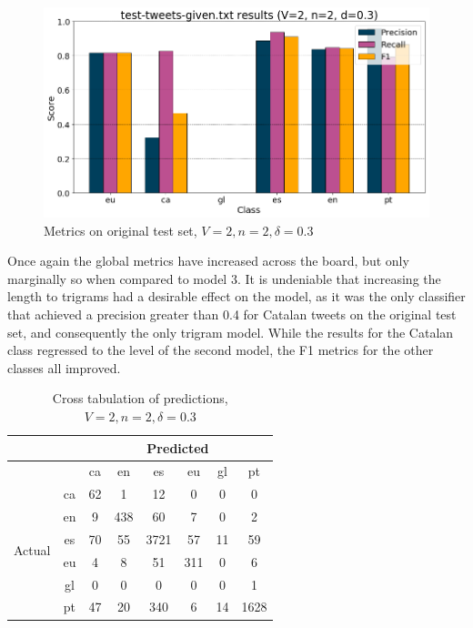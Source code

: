 \documentclass[runningheads]{llncs}
\begin{document}
\begin{figure}
    \begin{center}
        \includegraphics[width=12.5cm]{images/test_tweets_given_results_2_2_0-3.png}
        \caption{Metrics on original test set, $V=2, n=2, \delta=0.3$}
        \label{fig:pre_demo_2_2_0.3}
    \end{center}
\end{figure}

Once again the global metrics have increased across the board, but only marginally so when compared to model 3. It is undeniable that increasing the length to trigrams had a desirable effect on the model, as it was the only classifier that achieved a precision greater than 0.4 for Catalan tweets on the original test set, and consequently the only trigram model. While the results for the Catalan class regressed to the level of the second model, the F1 metrics for the other classes all improved.

\begin{table}
	\centering
	\caption{Cross tabulation of predictions, $V=2, n=2, \delta=0.3$}
	\label{tab:pre_demo_confusion_2_2_0.3}
	\begin{tabular}{|c|c|c|c|c|c|c|c|} \hline
		& & \multicolumn{6}{c|}{Predicted} \\ \hline
		& &  ca &   en &    es &   eu &  gl &    pt \\ \hline
		\multirow{6}{*}{Actual} & ca   &  62 &    1 &    12 &    0 &   0 &     0 \\
		& en   &   9 &  438 &    60 &    7 &   0 &     2 \\
		& es   &  70 &   55 &  3721 &   57 &  11 &    59 \\
		& eu   &   4 &    8 &    51 &  311 &   0 &     6 \\
		& gl   &   0 &    0 &     0 &    0 &   0 &     1 \\
		& pt   &  47 &   20 &   340 &    6 &  14 &  1628 \\ \hline
	\end{tabular}
\end{table}
\end{document}

